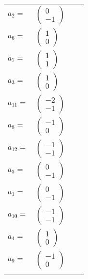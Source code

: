 \documentclass[1p]{elsarticle_modified}
\theoremstyle{definition}
\begin{document}
\begin{tabular}{m{7pt} m{180pt} m{7pt} m{180pt} }
\flushright $a_{2}=$&$\begin{pmatrix}0\\-1\end{pmatrix}$ \\
\flushright $a_{6}=$&$\begin{pmatrix}1\\0\end{pmatrix}$ \\
\flushright $a_{7}=$&$\begin{pmatrix}1\\1\end{pmatrix}$ \\
\flushright $a_{3}=$&$\begin{pmatrix}1\\0\end{pmatrix}$ \\
\flushright $a_{11}=$&$\begin{pmatrix}-2\\-1\end{pmatrix}$ \\
\flushright $a_{8}=$&$\begin{pmatrix}-1\\0\end{pmatrix}$ \\
\flushright $a_{12}=$&$\begin{pmatrix}-1\\-1\end{pmatrix}$ \\
\flushright $a_{5}=$&$\begin{pmatrix}0\\-1\end{pmatrix}$ \\
\flushright $a_{1}=$&$\begin{pmatrix}0\\-1\end{pmatrix}$ \\
\flushright $a_{10}=$&$\begin{pmatrix}-1\\-1\end{pmatrix}$ \\
\flushright $a_{4}=$&$\begin{pmatrix}1\\0\end{pmatrix}$ \\
\flushright $a_{9}=$&$\begin{pmatrix}-1\\0\end{pmatrix}$\\&\end{tabular}
\end{document}
